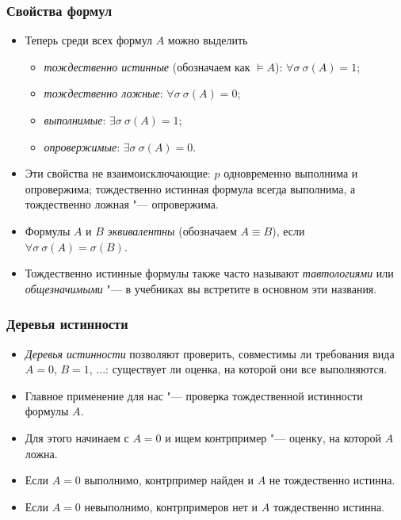 \documentclass[10pt]{beamer}
\begin{document}
\begin{frame}
    \frametitle{Свойства формул}
    \begin{itemize}
        \item Теперь среди всех формул $A$ можно выделить
        \begin{itemize}
            \item \emph{тождественно истинные} (обозначаем как $\vDash A$): $\forall \sigma ~ \sigma(A) = 1$;
            \item \emph{тождественно ложные}: $\forall \sigma ~ \sigma(A) = 0$;
            \item \emph{выполнимые}: $\exists \sigma ~ \sigma(A) = 1$;
            \item \emph{опровержимые}: $\exists \sigma ~ \sigma(A) = 0$.
        \end{itemize}
        \pause
        \item Эти свойства не взаимоисключающие: $p$ одновременно выполнима и опровержима; тождественно истинная формула всегда выполнима, а тождественно ложная "--- опровержима.
        \pause
        \item Формулы $A$ и $B$ \emph{эквивалентны} (обозначаем $A \equiv B$), если $\forall \sigma ~ \sigma(A) = \sigma(B)$.
        \pause
        \item Тождественно истинные формулы также часто называют \emph{тавтологиями} или \emph{общезначимыми} "--- в учебниках вы встретите в основном эти названия.
    \end{itemize}
\end{frame}

\begin{frame}
\frametitle{Деревья истинности}
\begin{itemize}
    \item \emph{Деревья истинности} позволяют проверить, совместимы ли требования вида $A=0$, $B=1$, $\ldots$: существует ли оценка, на которой они все выполняются.
    \pause
    \item Главное применение для нас "--- проверка тождественной истинности формулы $A$.
    \item Для этого начинаем с $A=0$ и ищем контрпример "--- оценку, на которой $A$ ложна.
    \pause
    \item Если $A=0$ выполнимо, контрпример найден и $A$ не тождественно истинна.
    \item Если $A=0$ невыполнимо, контрпримеров нет и $A$ тождественно истинна.
\end{itemize}
\end{frame}
\end{document}
